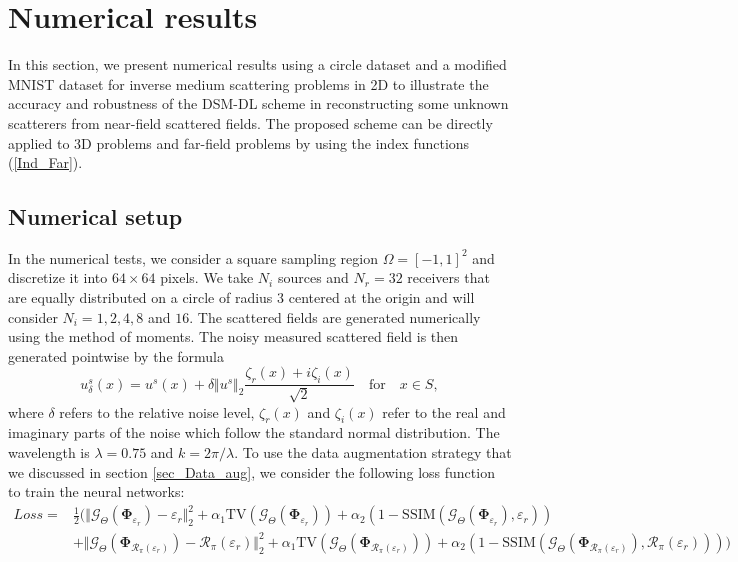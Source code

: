 \documentclass{article}
\begin{document}
	\section{Numerical results} \label{secNumeri}
	In this section, we present numerical results using a circle dataset and a modified MNIST dataset for inverse medium scattering problems in 2D to illustrate the accuracy and robustness of the DSM-DL scheme in reconstructing some unknown scatterers from near-field scattered fields. The proposed scheme can be directly applied to 3D problems and far-field problems by using the index functions (\ref{Ind_Far}). 
	
	\subsection{Numerical setup}
	In the numerical tests, we consider a square sampling region $\Omega=[-1,1]^2$ and discretize it into $64\times64$ pixels. We take $N_{i}$ sources and $N_r=32$ receivers that are equally distributed on a circle of radius $3$ centered at the origin and will consider $N_i=1, 2, 4, 8$ and $16$. The scattered fields are generated numerically using the method of moments. The noisy measured scattered field is then generated pointwise by the formula
	\begin{equation}
		u^{s}_{\delta}(x)=u^{s}(x)+\delta\Vert u^{s}\Vert_{2}\frac{\zeta_{r}(x)+i\zeta_{i}(x)}{\sqrt{2}} \quad \text{for} \quad x \in S,
	\end{equation}
    where $\delta$ refers to the relative noise level,
    $\zeta_{r}(x)$ and $\zeta_{i}(x)$ refer to the real and imaginary parts of the noise which follow the standard normal distribution.
  The wavelength is $\lambda=0.75$ and $k = 2\pi/\lambda$. To use the data augmentation strategy that we discussed in section \ref{sec_Data_aug}, we consider the following loss function to train the neural networks:
	\begin{equation}
		\begin{split}	Loss =& \frac{1}{2}\bigg(\Vert \mathcal{G}_\Theta(\mathbf{\Phi}_{\varepsilon_{r}})-\varepsilon_{r}\Vert_{2}^{2} + \alpha_{1} \text{TV}(\mathcal{G}_\Theta(\mathbf{\Phi}_{\varepsilon_{r}}))  + \alpha_{2}(1-\text{SSIM}(\mathcal{G}_\Theta(\mathbf{\Phi}_{\varepsilon_{r}}),\varepsilon_{r}))\\
		&+\Vert \mathcal{G}_\Theta(\mathbf{\Phi}_{\mathcal{R}_{\pi}(\varepsilon_{r})})-\mathcal{R}_{\pi}(\varepsilon_{r})\Vert_{2}^{2} + \alpha_{1} \text{TV}(\mathcal{G}_\Theta(\mathbf{\Phi}_{\mathcal{R}_{\pi}(\varepsilon_{r})}))  + \alpha_{2}(1-\text{SSIM}(\mathcal{G}_\Theta(\mathbf{\Phi}_{\mathcal{R}_{\pi}(\varepsilon_{r})}),\mathcal{R}_{\pi}(\varepsilon_{r})))\bigg)
		\end{split}
	\label{loss_func}
	\end{equation} 
\end{document}
